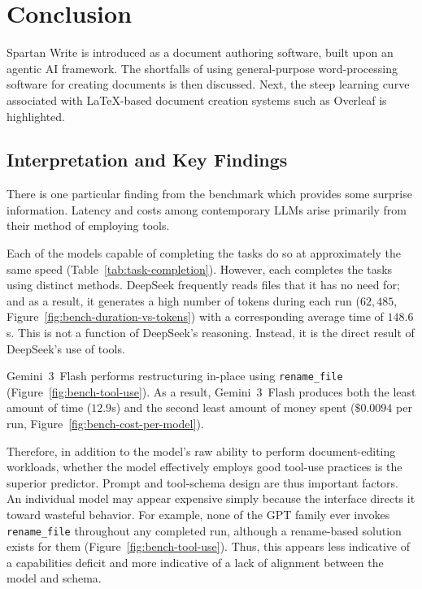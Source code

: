 \section{Conclusion}

Spartan Write is introduced as a document authoring software, built upon an agentic AI framework.
The shortfalls of using general-purpose word-processing software for creating documents is then discussed.
Next, the steep learning curve associated with \LaTeX-based document creation systems such as Overleaf is highlighted.


\subsection{Interpretation and Key Findings}

There is one particular finding from the benchmark which provides some surprise information.
Latency and costs among contemporary LLMs arise primarily from their method of employing tools.

Each of the models capable of completing the tasks do so at approximately the same speed (Table~\ref{tab:task-completion}).
However, each completes the tasks using distinct methods.
DeepSeek frequently reads files that it has no need for; and as a result, it generates a high number of tokens during each run ($62{,}485$, Figure~\ref{fig:bench-duration-vs-tokens}) with a corresponding average time of $148.6$s.
This is not a function of DeepSeek's reasoning.
Instead, it is the direct result of DeepSeek's use of tools.

Gemini~3~Flash performs restructuring in-place using \texttt{rename\_file} (Figure~\ref{fig:bench-tool-use}).
As a result, Gemini~3~Flash produces both the least amount of time ($12.9$s) and the second least amount of money spent ($\$0.0094$ per run, Figure~\ref{fig:bench-cost-per-model}).

Therefore, in addition to the model's raw ability to perform document-editing workloads, whether the model effectively employs good tool-use practices is the superior predictor.
Prompt and tool-schema design are thus important factors.
An individual model may appear expensive simply because the interface directs it toward wasteful behavior.
For example, none of the GPT family ever invokes \texttt{rename\_file} throughout any completed run, although a rename-based solution exists for them (Figure~\ref{fig:bench-tool-use}).
Thus, this appears less indicative of a capabilities deficit and more indicative of a lack of alignment between the model and schema.

